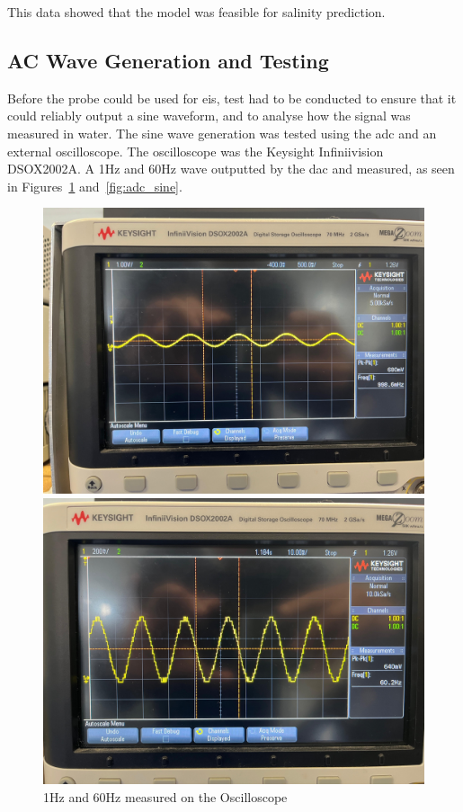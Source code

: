 This data showed that the model was feasible for salinity prediction.

\subsection{AC Wave Generation and Testing}
Before the probe could be used for \gls{eis}, test had to be conducted to ensure that it could reliably output a sine waveform, and to analyse how the signal was measured in water.
The sine wave generation was tested using the adc and an external oscilloscope. 
The oscilloscope was the Keysight Infiniivision DSOX2002A.
A 1Hz and 60Hz wave outputted by the \gls{dac} and measured, as seen in Figures~\ref{fig:oscilloscope} and~\ref{fig:adc_sine}.

\begin{figure}[H]
    \centering
    \begin{minipage}[t]{0.48\textwidth}
        \centering
        \includegraphics[width=\linewidth]{Figures/osc_1hz.jpg}
    \end{minipage}
    \hfill
    \begin{minipage}[t]{0.48\textwidth}
        \centering
        \includegraphics[width=\linewidth]{Figures/osc_60hz.jpg}
    \end{minipage}
    \caption{1Hz and 60Hz measured on the Oscilloscope}
    \label{fig:oscilloscope}
\end{figure}

